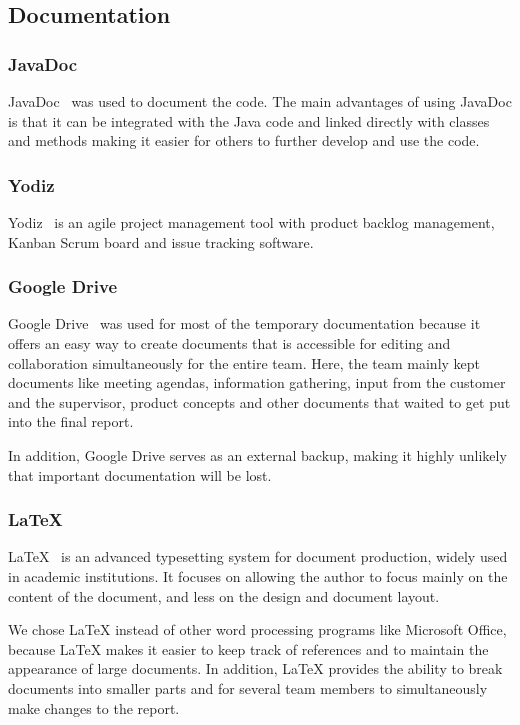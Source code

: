 \subsection{Documentation}

\subsubsection{JavaDoc}
JavaDoc~\cite{javadoc} was used to document the code. The main advantages of using JavaDoc is that it can be integrated with the Java code and linked directly with classes and methods making it easier for others to further develop and use the code.

\subsubsection{Yodiz}
Yodiz~\cite{yodiz} is an agile project management tool with product backlog management, Kanban Scrum board and issue tracking software.


\subsubsection{Google Drive}
Google Drive~\cite{gdrive} was used for most of the temporary documentation because it offers an easy way to create documents that is accessible for editing and collaboration simultaneously for the entire team. Here, the team mainly kept documents like meeting agendas, information gathering, input from the customer and the supervisor, product concepts and other documents that waited to get put into the final report. 

In addition, Google Drive serves as an external backup, making it highly unlikely that important documentation will be lost. 


\subsubsection{\LaTeX}
LaTeX~\cite{latex} is an advanced typesetting system for document production, widely used in
academic institutions. It focuses on allowing the author to focus mainly on the content of the document, and less on the design and document layout.

We chose LaTeX instead of other word processing programs like Microsoft Office, because LaTeX makes it easier to keep track of references and to maintain the appearance of large
documents. In addition, LaTeX provides the ability to break documents into smaller parts and for several team members to simultaneously make changes to the report.

